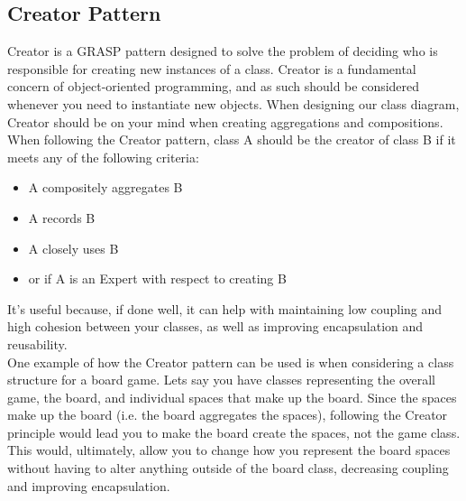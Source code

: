 \documentclass{article}
\begin{document}
    \subsection{Creator Pattern}
    Creator is a GRASP pattern designed to solve the problem of deciding who is
    responsible for creating new instances of a class. Creator is a fundamental
    concern of object-oriented programming, and as such should be considered
    whenever you need to instantiate new objects. When designing our class
    diagram, Creator should be on your mind when creating aggregations and
    compositions. When following the Creator pattern, class A should be the
    creator of class B if it meets any of the following criteria:
    \begin{itemize}
        \item A compositely aggregates B
        \item A records B
        \item A closely uses B
        \item or if A is an Expert with respect to creating B
    \end{itemize}
    It's useful because, if done well, it can help with maintaining low coupling
    and high cohesion between your classes, as well as improving encapsulation
    and reusability.\\
    One example of how the Creator pattern can be used is when considering a
    class structure for a board game. Lets say you have classes representing the
    overall game, the board, and individual spaces that make up the board. Since
    the spaces make up the board (i.e. the board aggregates the spaces),
    following the Creator principle would lead you to make the board create the
    spaces, not the game class. This would, ultimately, allow you to change how
    you represent the board spaces without having to alter anything outside of
    the board class, decreasing coupling and improving encapsulation.
    \newpage
\end{document}

